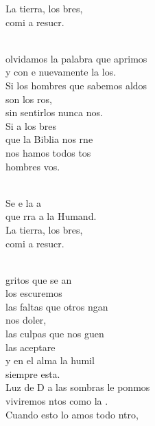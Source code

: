 \begin{cancion}
\begin{chorus}
	La tierra, los bres,\\
	comi a resucr.\\
	\end{chorus}%
	\jump\\
	olvidamos la palabra que aprimos\\
	y con e nuevamente la los.\\
	Si los hombres que sabemos aldos\\
	son los ros, \\
	sin sentirlos nunca nos.\\
	Si a los bres \\
	que la Biblia nos rne \\
	nos hamos todos tos \\
	hombres vos.\\\jump\\
	\begin{chorus}%
	Se e la a\\
	que rra a la Humand.\\
	La tierra, los bres,\\
	comi a resucr.\\
	\end{chorus}%
	\jump\\
	 gritos que se an \\
	los escuremos\\
	las faltas que otros ngan \\
	nos doler,\\
	las culpas que nos guen \\
	las aceptare\\
	y en el alma la humil \\
	siempre esta.\\
	Luz de D a las sombras le ponmos\\
	viviremos ntos como la .\\
	Cuando esto lo amos todo ntro,\\

\end{cancion}
